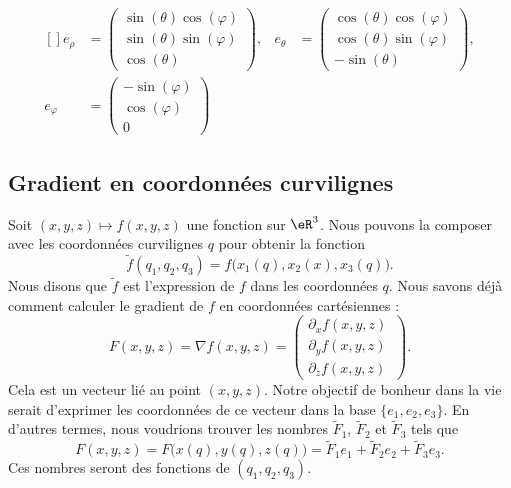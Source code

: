 \begin{equation}
	\begin{aligned}[]
		e_{\rho}    & =\begin{pmatrix}
			               \sin(\theta)\cos(\varphi) \\
			               \sin(\theta)\sin(\varphi) \\
			               \cos(\theta)
		               \end{pmatrix},
		            & e_{\theta}                   & =
		\begin{pmatrix}
			\cos(\theta)\cos(\varphi) \\
			\cos(\theta)\sin(\varphi) \\
			-\sin(\theta)
		\end{pmatrix},                      \\
		e_{\varphi} & =
		\begin{pmatrix}
			-\sin(\varphi) \\
			\cos(\varphi)  \\
			0
		\end{pmatrix}
	\end{aligned}
\end{equation}

\subsection{Gradient en coordonnées curvilignes}

Soit \( (x,y,z)\mapsto f(x,y,z)\) une fonction sur \( \eR^3\). Nous pouvons la composer avec les coordonnées curvilignes \( q\) pour obtenir la fonction
\begin{equation}
	\tilde f(q_1,q_2,q_3)=f\big( x_1(q),x_2(x),x_3(q) \big).
\end{equation}
Nous disons que \( \tilde f\) est l'expression de \( f\) dans les coordonnées \( q\). Nous savons déjà comment calculer le gradient de \( f\) en coordonnées cartésiennes :
\begin{equation}
	F(x,y, z)=\nabla f(x,y,z)=\begin{pmatrix}
		\partial_xf(x,y,z) \\
		\partial_yf(x,y,z) \\
		\partial_zf(x,y,z)    \
	\end{pmatrix}.
\end{equation}
Cela est un vecteur lié au point \( (x,y,z)\). Notre objectif de bonheur dans la vie serait d'exprimer les coordonnées de ce vecteur dans la base \( \{ e_1,e_2,e_3 \}\). En d'autres termes, nous voudrions trouver les nombres \( \tilde F_1\), \( \tilde F_2\) et \( \tilde F_3\) tels que
\begin{equation}
	F(x,y,z)=F\big( x(q),y(q),z(q) \big)=\tilde F_1e_1+\tilde F_2e_2+\tilde F_3e_3.
\end{equation}
Ces nombres seront des fonctions de \( (q_1,q_2,q_3)\).

